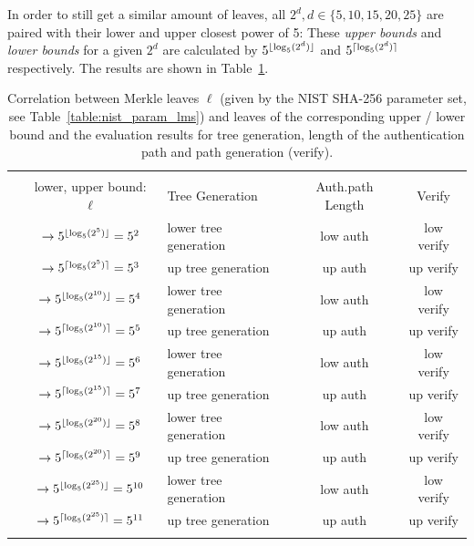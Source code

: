 In order to still get a similar amount of leaves, all $2^d, d \in \{5,10,15,20,25\}$ are paired with their lower and upper closest power of 5:
These \textit{upper bounds} and \textit{lower bounds} for a given $2^d$ are calculated by $5^{\lfloor\log_5(2^d)\rfloor}$ and $5^{\lceil\log_5(2^d)\rceil}$ respectively. The results are shown in Table~\ref{table:nist_upper_lower_bound}. 

\begin{table}
\centering
\begin{tabular}{c c l c c} 
 \hline\noalign{\smallskip}
 \multicolumn{5}{c}{\textbf{Merkle Tree - Lower / Upper Bound \extree}} \\
 \noalign{\smallskip} 
 & lower, upper bound: $\ell$ & Tree Generation & Auth.path Length & Verify \\
 \hline\noalign{\smallskip}
 \multirow{2}{*}{$2^5$} & $\rightarrow 5^{\lfloor\log_5(2^5)\rfloor} = 5^{2} $ & lower tree generation & low auth & low verify \\
 & $\rightarrow 5^{\lceil\log_5(2^5)\rceil} = 5^{3}$ & up tree generation & up auth & up verify \\
 \hline\noalign{\smallskip} 
 \multirow{2}{*}{$2^{10}$} & $\rightarrow 5^{\lfloor\log_5(2^{10})\rfloor} = 5^{4}$ & lower tree generation & low auth & low verify \\
 & $\rightarrow 5^{\lceil\log_5(2^{10})\rceil} = 5^{5}$ & up tree generation & up auth & up verify \\
 \hline\noalign{\smallskip} 
 \multirow{2}{*}{$2^{15}$}& $\rightarrow 5^{\lfloor\log_5(2^{15})\rfloor} = 5^{6}$ & lower tree generation & low auth & low verify \\ 
 & $\rightarrow 5^{\lceil\log_5(2^{15})\rceil} = 5^{7}$ & up tree generation & up auth & up verify \\ 
 \hline\noalign{\smallskip} 
 \multirow{2}{*}{$2^{20}$} & $\rightarrow 5^{\lfloor\log_5(2^{20})\rfloor} = 5^{8}$ & lower tree generation & low auth & low verify \\ 
 & $\rightarrow 5^{\lceil\log_5(2^{20})\rceil} = 5^{9}$ & up tree generation & up auth & up verify \\
 \hline\noalign{\smallskip}  
  \multirow{2}{*}{$2^{25}$} & $\rightarrow 5^{\lfloor\log_5(2^{25})\rfloor} =  5^{10}$ & lower tree generation & low auth & low verify \\ 
 & $\rightarrow 5^{\lceil\log_5(2^{25})\rceil} = 5^{11}$ & up tree generation & up auth & up verify \\
 \hline\noalign{\smallskip}
 \end{tabular}
\caption{Correlation between Merkle leaves $\ell$ (given by the NIST SHA-256 parameter set, see Table~\ref{table:nist_param_lms}) and leaves of the corresponding upper / lower bound \extree and the evaluation results for tree generation, length of the authentication path and path generation (verify).}
\label{table:nist_upper_lower_bound}
\end{table}

